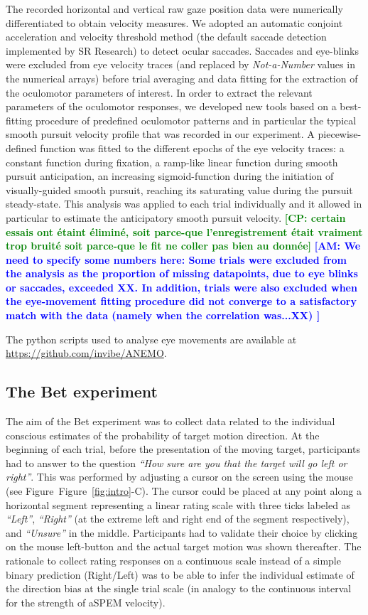 \documentclass[12pt,english]{article}%
\newcommand{\seeFig}[1]{Figure~\ref{fig:#1}}
\newcommand{\AM}[1]{\textbf{\textcolor{blue}{[AM: #1]}}}
\newcommand{\CP}[1]{\textbf{\textcolor{green}{[CP: #1]}}}
\begin{document}
The recorded horizontal and vertical raw gaze position data were numerically differentiated to obtain velocity measures. We adopted an automatic conjoint acceleration and velocity threshold method (the default saccade detection implemented by SR Research) to detect ocular saccades. Saccades and eye-blinks were excluded from eye velocity traces (and replaced by \textit{Not-a-Number} values in the numerical arrays) before trial averaging and data fitting for the extraction of the oculomotor parameters of interest.
In order to extract the relevant parameters of the oculomotor responses, we developed new tools based on a best-fitting procedure of predefined oculomotor patterns and in particular the typical smooth pursuit velocity profile that was recorded in our experiment. A piecewise-defined function was fitted to the different epochs of the eye velocity traces: a constant function during fixation, a ramp-like linear function during smooth pursuit anticipation, an increasing sigmoid-function during the initiation of visually-guided smooth pursuit, reaching its saturating value during the pursuit steady-state. This analysis was applied to each trial individually and it allowed in particular to estimate the anticipatory smooth pursuit velocity. 
\CP{certain essais ont \'etaint \'elimin\'e, soit parce-que l'enregistrement \'etait vraiment trop bruit\'e soit parce-que le fit ne coller pas bien au donn\'ee} \AM{We need to specify some numbers here: Some trials were excluded from the analysis as the proportion of missing datapoints, due to eye blinks or saccades, exceeded XX. In addition, trials were also excluded when the eye-movement fitting procedure did not converge to a satisfactory match with the data (namely when the correlation was...XX) }

The python scripts used to analyse eye movements are available at \url{https://github.com/invibe/ANEMO}.

\subsection{The Bet experiment}
The aim of the Bet experiment was to collect data related to the individual conscious estimates of the probability of target motion direction. At the beginning of each trial, before the presentation of the moving target, participants had to answer to the question \textit{ ``How sure are you that the target will go left or right''}. This was performed by adjusting a cursor on the screen using the mouse (see Figure~\seeFig{intro}-C). The cursor could be placed at any point along a horizontal segment representing a linear rating scale with three ticks labeled as \textit{ ``Left''}, \textit{``Right''} (at the extreme left and right end of the segment respectively), and \textit{``Unsure''} in the middle. Participants had to validate their choice by clicking on the mouse left-button and the actual target motion was shown thereafter. The rationale to collect rating responses on a continuous scale instead of a simple binary prediction (Right/Left) was to be able to infer the individual estimate of the direction bias at the single trial scale (in analogy to the continuous interval for the strength of aSPEM velocity).
\end{document}
